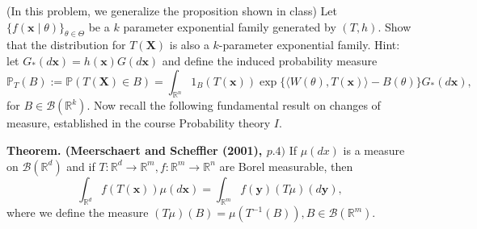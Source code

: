 \documentclass[12pt]{article}
\begin{document}
    \begin{exercise}
        (In this problem, we generalize the proposition shown in class) Let \(\{f(\mathbf{x} \mid \theta)\}_{\theta \in \Theta}\) be a \(k\) parameter exponential family generated by \((T, h)\). Show that the distribution for \(T(\mathbf{X})\) is also a \(k\)-parameter exponential family. Hint: let \(G_{*}(d \mathbf{x})=h(\mathbf{x}) G(d \mathbf{x})\) and define the induced probability measure
        \[
            \mathbb{P}_{T}(B):=\mathbb{P}(T(\mathbf{X}) \in B)=\int_{\mathbb{R}^{n}} 1_{B}(T(\mathbf{x})) \exp \{\langle W(\theta), T(\mathbf{x})\rangle-B(\theta)\} G_{*}(d \mathbf{x}), 
        \]
        for \(B \in \mathcal{B}\left(\mathbb{R}^{k}\right)\). Now recall the following fundamental result on changes of measure, established in the course Probability theory \(I\). 

        {\bfseries Theorem. (Meerschaert and Scheffler (2001), \(p .4)\)} If \(\mu(d x)\) is a measure on \(\mathcal{B}\left(\mathbb{R}^{d}\right)\) and if \(T: \mathbb{R}^{d} \rightarrow \mathbb{R}^{m}, f: \mathbb{R}^{m} \rightarrow \mathbb{R}^{n}\) are Borel measurable, then
        \[
            \int_{\mathbb{R}^{d}} f(T(\boldsymbol{x})) \mu(d \boldsymbol{x})=\int_{\mathbb{R}^{m}} f(\boldsymbol{y})(T \mu)(d \boldsymbol{y}),
        \]
        where we define the measure \((T \mu)(B)=\mu\left(T^{-1}(B)\right), B \in \mathcal{B}\left(\mathbb{R}^{m}\right)\). 
    \end{exercise}




    
        
\end{document}
